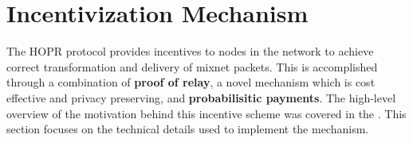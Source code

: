 \section{Incentivization Mechanism}
\label{sec:incentiviationmechanism}

The HOPR protocol provides incentives to nodes in the network to achieve correct
transformation and delivery of mixnet packets. This is accomplished through a
combination of \textbf{proof of relay}, a novel mechanism which is
cost effective and privacy preserving, and \textbf{probabilisitic payments}.
The high-level overview of the motivation behind this incentive scheme was covered in the
. This section focuses on the technical details used to implement the mechanism.






